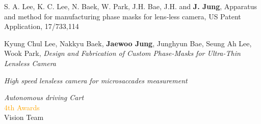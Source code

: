 \documentclass[a4paper,12pt]{memoir} %
\begin{document}
\Sep %



{S. A. Lee, K. C. Lee, N. Baek, W. Park, J.H. Bae, J.H. and \textbf{J. Jung}, Apparatus and method for manufacturing phase masks for lens‐less camera, US Patent Application, 17/733,114}


\Sep

\clearpage %

\userinformation %

\framebreak %




{Kyung Chul Lee, Nakkyu Baek, \textbf{Jaewoo Jung}, Junghyun Bae, Seung Ah Lee, Wook Park, \textit{Design and Fabrication of Custom Phase-Masks for Ultra-Thin Lensless Camera}}


\Sep



{\textit{High speed lensless camera for microsaccades measurement}}



{\textit{Autonomous driving Cart}\\\textcolor{orange}{4th Awards}\\{Vision Team}}
\end{document}
